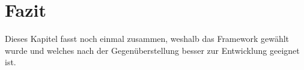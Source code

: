 \section{Fazit}
Dieses Kapitel fasst noch einmal zusammen, weshalb das Framework gewählt wurde und welches nach der Gegenüberstellung besser zur Entwicklung geeignet ist.